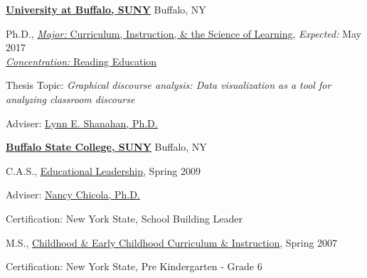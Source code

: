 \href{http://www.buffalo.edu/}{\textbf{University at Buffalo, SUNY}}
Buffalo, NY
\begin{outerlist}

\item[] Ph.D.,
        \href{http://gse.buffalo.edu/programs/cisl}
             {\emph{Major:} Curriculum, Instruction, \& the Science of Learning},
             \emph{Expected:} May 2017 \\
             \href{http://gse.buffalo.edu/programs/cisl/reading}{\emph{Concentration:} Reading Education}
        \begin{innerlist}
        \item Thesis Topic: \emph{Graphical discourse analysis: Data visualization as a tool for analyzing classroom discourse}
        \item Adviser:
              \href{http://gse.buffalo.edu/about/directory/faculty/2110}
                   {Lynn E. Shanahan, Ph.D.}
        \end{innerlist}
\end{outerlist}
\vspace{.1in}

\href{http://www.buffalostate.edu/}{\textbf{Buffalo State College, SUNY}}
Buffalo, NY
\begin{outerlist}

\item[] C.A.S.,
        \href{http://www.buffalostate.edu/gradprog.xml?bpid=27}
             {Educational Leadership},
             Spring 2009
        \begin{innerlist}
        \item Adviser:
              \href{http://elementaryeducation.buffalostate.edu/faculty/nancy-chicola}
                   {Nancy Chicola, Ph.D.}
        \item Certification: New York State, School Building Leader     
        \end{innerlist}
\end{outerlist}
\vspace{.1in}

\begin{outerlist}

\item[] M.S.,
        \href{http://www.buffalostate.edu/gradprog.xml?bpid=27}
             {Childhood \& Early Childhood Curriculum \& Instruction},
             Spring 2007
        \begin{innerlist}
        \item Certification: New York State, Pre Kindergarten - Grade 6      
        \end{innerlist}
\end{outerlist}
\vspace{.1in}


